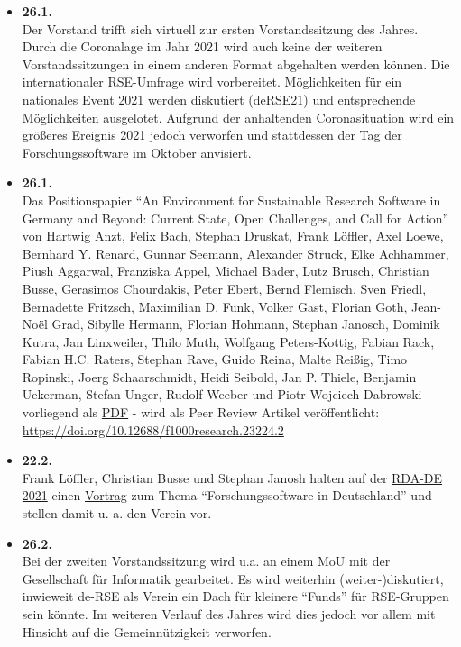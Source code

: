 \begin{itemize}
 \item \textbf{26.1.}\\Der Vorstand trifft sich virtuell zur ersten Vorstandssitzung des Jahres. Durch die Coronalage im Jahr 2021 wird auch keine der weiteren Vorstandssitzungen in einem anderen Format abgehalten werden können. Die internationaler RSE-Umfrage wird vorbereitet. Möglichkeiten für ein nationales Event 2021 werden diskutiert (deRSE21) und entsprechende Möglichkeiten ausgelotet. Aufgrund der anhaltenden Coronasituation wird ein größeres Ereignis 2021 jedoch verworfen und stattdessen der Tag der Forschungssoftware im Oktober anvisiert.
 \item \textbf{26.1.}\\Das Positionspapier "`An Environment for Sustainable Research Software in Germany and Beyond: Current State, Open Challenges, and Call for Action"' von Hartwig Anzt, Felix Bach, Stephan Druskat, Frank Löffler, Axel Loewe, Bernhard Y. Renard, Gunnar Seemann, Alexander Struck, Elke Achhammer, Piush Aggarwal, Franziska Appel, Michael Bader, Lutz Brusch, Christian Busse, Gerasimos Chourdakis, Peter Ebert, Bernd Flemisch, Sven Friedl, Bernadette Fritzsch, Maximilian D. Funk, Volker Gast, Florian Goth, Jean-Noël Grad, Sibylle Hermann, Florian Hohmann, Stephan Janosch, Dominik Kutra, Jan Linxweiler, Thilo Muth, Wolfgang Peters-Kottig, Fabian Rack, Fabian H.C. Raters, Stephan Rave, Guido Reina, Malte Reißig, Timo Ropinski, Joerg Schaarschmidt, Heidi Seibold, Jan P. Thiele, Benjamin Uekerman, Stefan Unger, Rudolf Weeber und Piotr Wojciech Dabrowski - vorliegend als \href{https://github.com/DE-RSE/positions/blob/8304df05448f22ae4293bb06ad513bc69a4ccc00/001/manuscript.pdf}{PDF} - wird als Peer Review Artikel veröffentlicht: \href{https://doi.org/10.12688/f1000research.23224.2}{https://doi.org/10.12688/f1000research.23224.2}
\item \textbf{22.2.}\\Frank Löffler, Christian Busse und Stephan Janosh halten auf der \href{https://indico.desy.de/event/28294/contributions/94417/}{RDA-DE 2021} einen \href{http://doi.org/10.5281/zenodo.4564161}{Vortrag} zum Thema ``Forschungssoftware in Deutschland'' und stellen damit u. a. den Verein vor.
 \item \textbf{26.2.}\\Bei der zweiten Vorstandssitzung wird u.a. an einem MoU mit der Gesellschaft für Informatik gearbeitet. Es wird weiterhin (weiter-)diskutiert, inwieweit de-RSE als Verein ein Dach für kleinere ``Funds'' für RSE-Gruppen sein könnte. Im weiteren Verlauf des Jahres wird dies jedoch vor allem mit Hinsicht auf die Gemeinnützigkeit verworfen.

\end{itemize}
